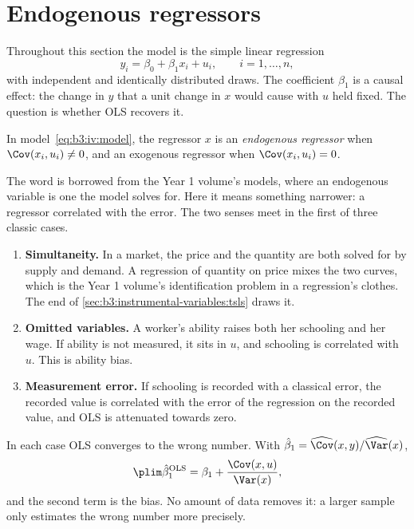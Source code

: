 \section{Endogenous regressors}\label{sec:b3:instrumental-variables:endogenous}

Throughout this section the model is the simple linear regression
\begin{equation}\label{eq:b3:iv:model}
  y_i = \beta_0 + \beta_1 x_i + u_i, \qquad i = 1, \dots, n,
\end{equation}
with independent and identically distributed draws. The coefficient $\beta_1$
is a causal effect: the change in $y$ that a unit change in $x$ would cause
with $u$ held fixed. The question is whether OLS recovers it.

\begin{definition}\label{def:b3:instrumental-variables:endogenous}
In model~\eqref{eq:b3:iv:model}, the regressor $x$ is an \emph{endogenous
regressor} when $\Cov(x_i, u_i) \neq 0$, and an exogenous regressor when
$\Cov(x_i, u_i) = 0$.
\end{definition}

The word is borrowed from the Year 1 volume's models, where an endogenous
variable is one the model solves for. Here it means something narrower: a
regressor correlated with the error. The two senses meet in the first of three
classic cases.

\begin{enumerate}
\item \textbf{Simultaneity.} In a market, the price and the quantity are both
solved for by supply and demand. A regression of quantity on price mixes the
two curves, which is the Year 1 volume's identification problem in a
regression's clothes. The end of \cref{sec:b3:instrumental-variables:tsls}
draws it.
\item \textbf{Omitted variables.} A worker's ability raises both her schooling
and her wage. If ability is not measured, it sits in $u$, and schooling is
correlated with $u$. This is ability bias.
\item \textbf{Measurement error.} If schooling is recorded with a classical
error, the recorded value is correlated with the error of the regression on
the recorded value, and OLS is attenuated towards zero.
\end{enumerate}

In each case OLS converges to the wrong number. With $\hat\beta_1 =
\widehat{\Cov}(x, y)/\widehat{\Var}(x)$,
\[
  \plim \hat\beta_1^{\mathrm{OLS}} = \beta_1 + \frac{\Cov(x, u)}{\Var(x)},
\]
and the second term is the bias. No amount of data removes it: a larger sample
only estimates the wrong number more precisely.

